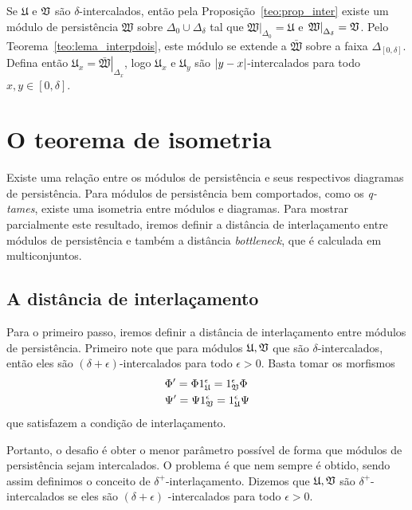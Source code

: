 Se $\mathfrak{U}$ e $\mathfrak{V}$ são $\delta$-intercalados, então 
pela Proposição~\ref{teo:prop_inter} existe um módulo de 
persistência $\mathfrak{W}$ sobre $\Delta_0 \cup \Delta_\delta$ tal
que $\left.\mathfrak{W}\right|_{\Delta_0} = \mathfrak{U}$ e 
$\left.\mathfrak{W}\right|_{\Delta_\delta} = \mathfrak{V}$. Pelo 
Teorema~\ref{teo:lema_interpdois}, este módulo se extende a 
$\bar{\mathfrak{W}}$ sobre a faixa $\Delta_{[0,\delta]}$.
Defina então $\mathfrak{U}_x = \left.\bar{\mathfrak{W}}\right|_{
\Delta_x}$, logo $\mathfrak{U}_x$ e $\mathfrak{U}_y$ são 
$\left\lvert y-x\right\rvert$-intercalados para todo $x,y\in [0, \delta]$. 

\section{O teorema de isometria}

Existe uma relação entre os módulos de persistência e seus respectivos diagramas 
de persistência. Para módulos de persistência bem comportados, como os 
\textit{q-tames}, existe uma isometria entre módulos e diagramas. Para mostrar 
parcialmente este resultado, iremos definir a distância de interlaçamento entre
módulos de persistência e também a distância \textit{bottleneck}, que é calculada
em multiconjuntos. 

\subsection{A distância de interlaçamento}

Para o primeiro passo, iremos definir a distância de interlaçamento entre
módulos de persistência. Primeiro note que para módulos 
$\mathfrak{U},  \mathfrak{V}$ que são $\delta$-intercalados, então eles
são $(\delta+\epsilon)$-intercalados para todo $\epsilon > 0$. Basta tomar
os morfismos
\begin{align*}
    & \Phi' = \Phi 1_{\mathfrak{U}}^\epsilon = 1_{\mathfrak{V}}^\epsilon \Phi \\
    & \Psi' = \Psi 1_{\mathfrak{V}}^\epsilon = 1_{\mathfrak{U}}^\epsilon \Psi
\end{align*}
que satisfazem a condição de interlaçamento. 

Portanto, o desafio é obter o menor parâmetro possível de forma que módulos
de persistência sejam intercalados. O problema é que nem sempre é obtido, 
sendo assim definimos o conceito de $\delta^+$-interlaçamento. Dizemos que 
$\mathfrak{U}, \mathfrak{V}$ são $\delta^+$-intercalados se eles são $(\delta + \epsilon)$
-intercalados para todo $\epsilon > 0$. 

